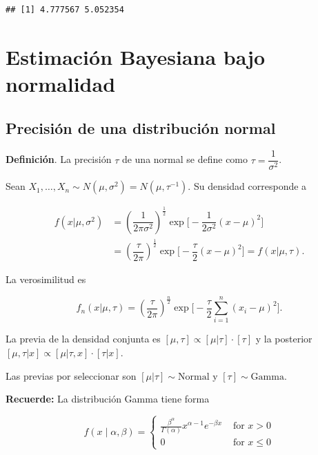 \documentclass[
  12pt,
]{book}
\begin{document}
\begin{verbatim}
## [1] 4.777567 5.052354
\end{verbatim}

\hypertarget{estimaciuxf3n-bayesiana-bajo-normalidad}{%
\chapter{Estimación Bayesiana bajo normalidad}\label{estimaciuxf3n-bayesiana-bajo-normalidad}}

\hypertarget{precisiuxf3n-de-una-distribuciuxf3n-normal}{%
\section{Precisión de una distribución normal}\label{precisiuxf3n-de-una-distribuciuxf3n-normal}}

\textbf{Definición}. La precisión \(\tau\) de una normal se define como \(\tau = \dfrac 1{\sigma^2}\).

Sean \(X_1,\dots,X_n\sim N(\mu,\sigma^2) = N(\mu,\tau ^{-1})\). Su densidad corresponde a

\begin{align*}
f(x|\mu,\sigma^2) 
&= \left(\dfrac 1{2\pi\sigma^2}\right)^{\frac12}\exp\bigg[-\dfrac1{2\sigma^2}(x-\mu)^2\bigg] \\
&= \left(\dfrac \tau{2\pi}\right)^{\frac12}\exp\bigg[-\dfrac\tau{2}(x-\mu)^2\bigg]=f(x|\mu,\tau).
\end{align*}

La verosimilitud es

\[f_n(x|\mu,\tau) = \left(\dfrac\tau{2\pi}\right)^{\frac n2}\exp\bigg[-\dfrac\tau2\sum_{i=1}^n(x_i-\mu)^2
\bigg].\]

La previa de la densidad conjunta es \([\mu,\tau]\propto [\mu|\tau]\cdot [\tau]\) y la posterior \([\mu,\tau|x] \propto [\mu|\tau,x]\cdot[\tau|x]\).

Las previas por seleccionar son \([\mu|\tau]\sim \text{Normal}\) y \([\tau]\sim\text{Gamma}\).

\textbf{Recuerde:} La distribución Gamma tiene forma

\begin{equation*}f(x \mid \alpha, \beta)=\left\{\begin{array}{ll}
\frac{\beta^{\alpha}}{\Gamma(\alpha)} x^{\alpha-1} e^{-\beta x} & \text { for } x>0 \\
0 & \text { for } x \leq 0
\end{array}\right.\end{equation*}
\end{document}

